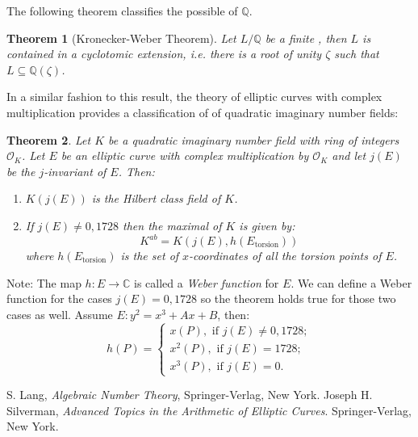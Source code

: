 \documentclass[12pt]{article}
\newtheorem{thm}{Theorem}
\newcommand{\Complex}{\mathbb{C}}
\newcommand{\Rats}{\mathbb{Q}}
\begin{document}
The following theorem classifies the possible 
of $\Rats$.

\begin{thm}[Kronecker-Weber Theorem]
Let $L/\Rats$ be a finite , then $L$ is contained
in a cyclotomic extension, i.e. there is a root of unity $\zeta$
such that $L \subseteq \Rats(\zeta)$.
\end{thm}

In a similar fashion to this result, the theory of elliptic curves
with complex multiplication provides a classification of  of quadratic imaginary number fields:

\begin{thm}
Let $K$ be a quadratic imaginary number field with ring of
integers $\mathcal{O}_K$. Let $E$ be an elliptic curve with
complex multiplication by $\mathcal{O}_K$ and let $j(E)$ be the
$j$-invariant of $E$. Then:
\begin{enumerate}
\item $K(j(E))$ is the Hilbert class field of $K$.

\item If $j(E)\neq 0,1728$ then the maximal  of
$K$ is given by:
$$K^{ab}=K(j(E),h(E_{\operatorname{torsion}}))$$
where $h(E_{\operatorname{torsion}})$ is the set of
$x$-coordinates of all the torsion points of $E$.
\end{enumerate}
\end{thm}

Note: The map $h\colon E \to \Complex$ is called a \emph{Weber
function} for $E$. We can define a Weber function for the cases
$j(E)=0,1728$ so the theorem holds true for those two cases as
well. Assume $E\colon y^2=x^3+Ax+B$, then:
$$ h(P)=
\begin{cases}
x(P) ,\text{ if $j(E)\neq 0, 1728$};\\
x^2(P) ,\text{ if $j(E)=1728$};\\
x^3(P) ,\text{ if $j(E)=0$}.
\end{cases}
$$

\begin{thebibliography}{9}
 S. Lang, {\em Algebraic Number Theory}, Springer-Verlag, New York.
 Joseph H. Silverman, {\em Advanced Topics in the Arithmetic of Elliptic Curves}. Springer-Verlag, New
York.
\end{thebibliography}
\end{document}
